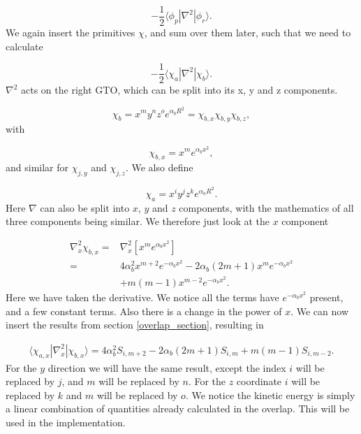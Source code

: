 \documentclass[a4paper,norsk,11pt,twoside]{report}
\begin{document}
\begin{equation}
-\frac{1}{2} \langle \phi_p | \nabla^2 | \phi_r \rangle .
\end{equation}
We again insert the primitives $\chi$, and sum over them later, such that we need to calculate 

\begin{equation}
- \frac{1}{2} \langle \chi_a | \nabla^2 | \chi_b \rangle . \label{tempequequ}
\end{equation}
$\nabla^2$ acts on the right GTO, which can be split into its x, y and z components.

\begin{equation}
\chi_b = x^m y^n z^o 
e^{\alpha_b R^2}
= \chi_{b,x} \chi_{b,y} \chi_{b,z} ,
\end{equation}
with

\begin{equation}
\chi_{b,x} = x^m e^{\alpha_b x^2} ,
\end{equation}
and similar for $\chi_{j,y}$ and $\chi_{j,z}$. We also define

\begin{equation}
\chi_a = x^i y^j z^k e^{\alpha_a R^2} .
\end{equation}
Here $\nabla$ can also be split into $x$, $y$ and $z$ components, with the mathematics of all three components being similar. We therefore just look at the $x$ component

\begin{align}
\nabla_x^2 \chi_{b,x} = & \nabla_x^2 
\left[
x^m e^{\alpha_b x^2}
\right] \nonumber \\
= & 
4 \alpha_b^2 x^{m+2} e^{-\alpha_b x^2}
- 2 \alpha_b (2 m + 1) x^m e^{-\alpha_b x^2} \nonumber \\ &
+ m (m-1) x^{m-2} e^{-\alpha_b x^2} .
\end{align}
Here we have taken the derivative. We notice all the terms have $e^{-\alpha_b x^2}$ present, and a few constant terms. Also there is a change in the power of $x$. We can now insert the results from section \ref{overlap_section}, resulting in 

\begin{align}
\langle \chi_{a,x} | \nabla_x^2 | \chi_{b,x} \rangle
= 4 \alpha_b^2 S_{i,m+2} 
- 2 \alpha_b (2 m + 1) S_{i,m} 
+ m (m - 1) S_{i,m-2} .
\label{EKintegralsss}
\end{align}
For the $y$ direction we will have the same result, except the index $i$ will be replaced by $j$, and $m$ will be replaced by $n$. For the $z$ coordinate $i$ will be replaced by $k$ and $m$ will be replaced by $o$. We notice the kinetic energy is simply a linear combination of quantities already calculated in the overlap. This will be used in the implementation. 
\end{document}
